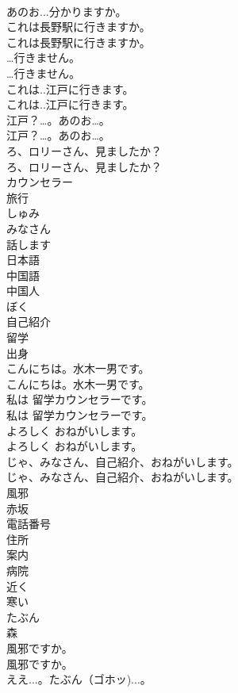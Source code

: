 \documentclass[8pt]{extreport}
\begin{document}
\begin{CJK}{UTF8}{min}
\\	あのお...分かりますか。 
\\	これは長野駅に行きますか。	
\\	これは長野駅に行きますか。 
\\	…行きません。	
\\	…行きません。 
\\	これは..江戸に行きます。	
\\	これは..江戸に行きます。 
\\	江戸？…。あのお…。	
\\	江戸？…。あのお…。 
\\	ろ、ロリーさん、見ましたか？	
\\	ろ、ロリーさん、見ましたか？ 
\\	カウンセラー
\\	旅行
\\	しゅみ
\\	みなさん
\\	話します
\\	日本語
\\	中国語
\\	中国人
\\	ぼく
\\	自己紹介
\\	留学
\\	出身
\\	こんにちは。水木一男です。	
\\	こんにちは。水木一男です。 
\\	私は 留学カウンセラーです。	
\\	私は 留学カウンセラーです。 
\\	よろしく おねがいします。	
\\	よろしく おねがいします。 
\\	じゃ、みなさん、自己紹介、おねがいします。	
\\	じゃ、みなさん、自己紹介、おねがいします。 
\\	風邪
\\	赤坂
\\	電話番号
\\	住所
\\	案内
\\	病院
\\	近く
\\	寒い
\\	たぶん
\\	森
\\	風邪ですか。	
\\	風邪ですか。 
\\	ええ...。たぶん（ゴホッ)...。	

\end{CJK}
\end{document}
